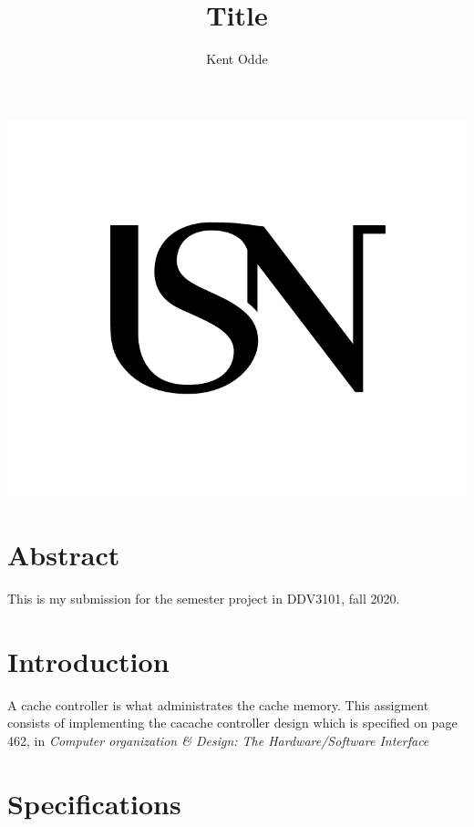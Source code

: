 \documentclass{article}
\begin{document}
\author{Kent Odde}
\title{Title}

\maketitle
\thispagestyle{empty}
\begin{center}
\includegraphics[width=\linewidth,height=0.2\textheight,keepaspectratio]{img/USN.png}
\end{center}
\newpage

\tableofcontents

\newpage

\section{Abstract}

This is my submission for the semester project in DDV3101, fall 2020.

\section{Introduction}
A cache controller is what administrates the cache memory. This assigment consists of implementing the cacache controller design which is specified on page 462, in \textit{Computer organization \& Design: The Hardware/Software Interface}

\section{Specifications}
\end{document}
